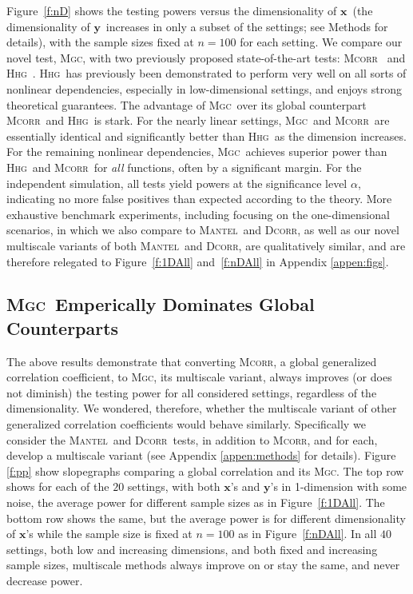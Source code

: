 \documentclass[11pt]{article}
\providecommand{\sct}[1]{{\normalfont\textsc{#1}}}
\providecommand{\mb}[1]{\boldsymbol{#1}}
\newcommand{\Mgc}{\sct{Mgc}}
\newcommand{\Hhg}{\sct{Hhg}}
\newcommand{\Dcorr}{\sct{Dcorr}}
\newcommand{\Mcorr}{\sct{Mcorr}}
\newcommand{\Mantel}{\sct{Mantel}}
\newcommand{\mbx}{\ensuremath{\mb{x}}}
\newcommand{\mby}{\ensuremath{\mb{y}}}
\begin{document}
Figure~\ref{f:nD} shows the testing powers versus the dimensionality of \mbx~(the dimensionality of \mby~increases in only a subset of the settings; see Methods for details), with the sample sizes fixed at $n=100$ for each setting.  We compare  our novel test, \Mgc, with two previously proposed state-of-the-art tests: \Mcorr~\cite{SzekelyRizzo2013a} and \Hhg~\cite{HellerGorfine2013}.  \Hhg~has previously been demonstrated to perform very well on all sorts of nonlinear dependencies, especially in low-dimensional settings, and enjoys strong theoretical guarantees. 
% 
The advantage of \Mgc~over its global counterpart \Mcorr~and \Hhg~is  stark. For the nearly linear settings, \Mgc~and \Mcorr~are essentially identical and significantly better than \Hhg~as the dimension increases.  For the remaining nonlinear dependencies, \Mgc~achieves superior power than \Hhg~and \Mcorr~for \emph{all} functions, often by a significant margin.  For the independent simulation, all tests yield powers at the significance level $\alpha$,  indicating no more false positives than expected according to the theory.
More exhaustive benchmark experiments, including focusing on the one-dimensional scenarios,
in which we also compare to \Mantel~and \Dcorr, 
as well as our novel multiscale variants of both \Mantel~and \Dcorr, 
 are qualitatively similar, and are therefore relegated to Figure~\ref{f:1DAll} and~\ref{f:nDAll} in Appendix \ref{appen:figs}. 



\subsection*{\Mgc~Emperically Dominates Global Counterparts}

The above results demonstrate that converting \Mcorr, a global generalized correlation coefficient, to \Mgc, its multiscale variant, always improves (or does not diminish) the testing power for all considered settings, regardless of the dimensionality.  We wondered, therefore, whether the multiscale variant of other generalized correlation coefficients would behave similarly.  Specifically we consider the \Mantel~and \Dcorr~tests, in addition to \Mcorr, and for each, develop a multiscale variant (see Appendix \ref{appen:methods} for details). 
% 
Figure \ref{f:pp} show slopegraphs comparing a global correlation and its \Mgc.  The top row shows for each of the $20$ settings, with both \mbx's and \mby's in 1-dimension with some noise, the average power for different sample sizes as in Figure~\ref{f:1DAll}.  The bottom row shows the same, but the average power is for different dimensionality of \mbx's while the sample size is fixed at $n=100$ as in Figure~\ref{f:nDAll}.  In all $40$ settings, both low and increasing dimensions, and both fixed and increasing sample sizes, multiscale methods always improve on or stay the same, and never decrease power. 
\end{document}
